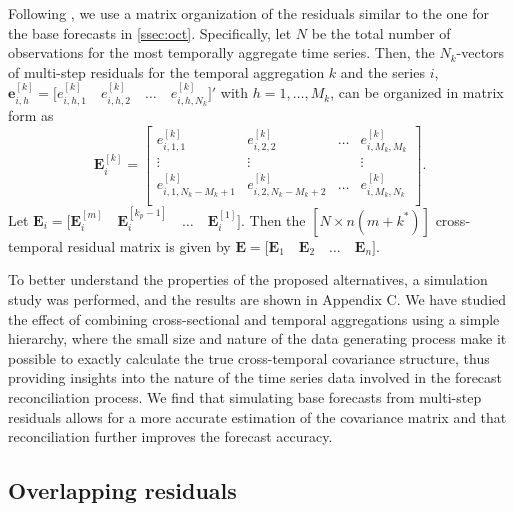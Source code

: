 \documentclass[a4paper,11pt]{article}
\newcommand{\evet}{\bm{e}}
\newcommand{\Evet}{\bm{E}}
\theoremstyle{definition}
\begin{document}
Following \cite{difonzo2023}, we use a matrix organization of the residuals similar to the one for the base forecasts in \autoref{ssec:oct}. Specifically, let $N$ be the total number of observations for the most temporally aggregate time series. Then, the $N_k$-vectors of multi-step residuals for the temporal aggregation $k$ and the series $i$, $\evet_{i,h}^{[k]} =  \Big[e_{i,h,1}^{[k]} \quad e_{i,h,2}^{[k]} \quad \dots \quad e_{i,h,N_k}^{[k]}\Big]'$ with $h = 1,\dots, M_k$, can be organized in matrix form as
$$
	\Evet_i^{[k]} = \begin{bmatrix}
		e_{i,1,1}^{[k]}                     & e_{i,2,2}^{[k]}                     & \dots & e_{i,M_k,M_k}^{[k]} \\
		\vdots                            & \vdots                            &       & \vdots                  \\
		e_{i,1,N_k - M_k + 1}^{[k]} & e_{i,2,N_k - M_k + 2}^{[k]} & \dots & e_{i,M_k,N_k}^{[k]}         \\
	\end{bmatrix}.
$$
Let $\Evet_i = \Big[\Evet_i^{[m]} \quad \Evet_i^{[k_p-1]} \quad \dots \quad \Evet_i^{[1]}  \Big]$. Then the $[N \times n(m+k^\ast)]$ cross-temporal residual matrix is given by $
	\Evet = \Big[\Evet_1 \quad \Evet_2 \quad \dots \quad \Evet_n \Big]$.

To better understand the properties of the proposed alternatives, a simulation study was performed, and the results are shown in Appendix C. We have studied the effect of combining cross-sectional and temporal aggregations using a simple hierarchy, where the small size and nature of the data generating process make it possible to exactly calculate the true cross-temporal covariance structure, thus providing insights into the nature of the time series data involved in the forecast reconciliation process. We find that simulating base forecasts from multi-step residuals allows for a more accurate estimation of the covariance matrix and that reconciliation further improves the forecast accuracy. %

\subsection{Overlapping residuals}\label{ssec:over_res}
\end{document}
